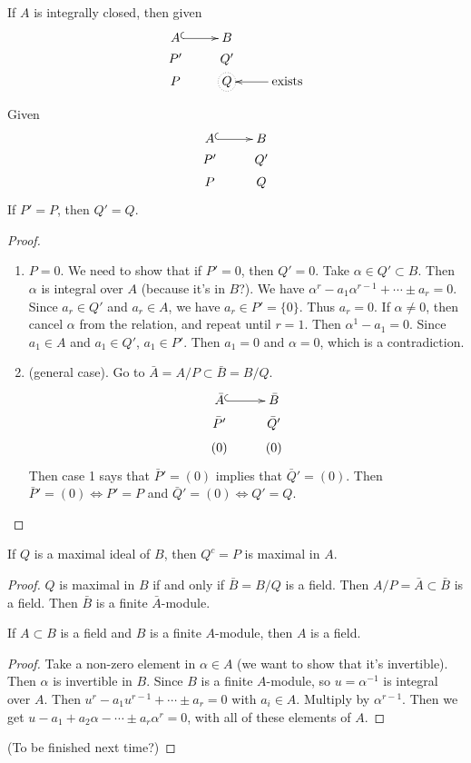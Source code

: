 \documentclass [letterpaper,11pt,twoside]{article}
\begin{document}
  \begin{fact}
    If $A$ is integrally closed, then given
    $$
    \xymatrix @R=0.25em{
      A \ar@{^{(}->}[r] & B \\
      P' &  Q' \\
      P & *+[o][F.]{Q} & \ar[l] \text{exists}
    }
    $$
  \end{fact}

  \begin{lem*}
    Given
    $$
    \xymatrix @R=0.25em{
      A \ar@{^{(}->}[r] & B \\
      P' &  Q' \\
      P & Q
    }
    $$
    If $P' = P$, then $Q' = Q$.
  \end{lem*}
  \begin{proof}
    \begin{enumerate}[{Case }1:]
      \item $P = 0$.  We need to show that if $P' = 0$, then $Q' = 0$.  Take $\alpha \in Q' \subset B$.  Then $\alpha$ is integral over $A$ (because it's in $B$?).  We have $\alpha^r - a_1 \alpha^{r-1} + \cdots \pm a_r = 0$.  Since $a_r \in Q'$ and $a_r\in A$, we have $a_r \in P' = \{0\}$.  Thus $a_r = 0$.  If $\alpha \ne 0$, then cancel $\alpha$ from the relation, and repeat until $r = 1$.  Then $\alpha^1 - a_1 = 0$.  Since $a_1 \in A$ and $a_1 \in Q'$, $a_1\in P'$.  Then $a_1 = 0$ and $\alpha = 0$, which is a contradiction.
      \item (general case).  Go to $\bar A = A / P \subset \bar B = B / Q$.
        $$
        \xymatrix @R=0.25em{
          \bar A \ar@{^{(}->}[r] & \bar B \\
          \bar P' &  \bar Q' \\
          (0) & (0)
        }
        $$
        Then case 1 says that $\bar P' = (0)$ implies that $\bar Q' = (0)$.  Then $\bar P' = (0) \iff P' = P$ and $\bar Q' = (0) \iff Q' = Q$.
    \end{enumerate}
  \end{proof}
  \begin{lem*}
    If $Q$ is a maximal ideal of $B$, then $Q^c = P$ is maximal in $A$.
  \end{lem*}
  \begin{proof}
    $Q$ is maximal in $B$ if and only if $\bar B = B / Q$ is a field.  Then $A / P = \bar A \subset \bar B$ is a field.  Then $\bar B$ is a finite $\bar A$-module.
    \begin{lem*}
      If $A \subset B$ is a field and $B$ is a finite $A$-module, then $A$ is a field.
    \end{lem*}
    \begin{proof}
      Take a non-zero element in $\alpha\in A$ (we want to show that it's invertible).  Then $\alpha$ is invertible in $B$.  Since $B$ is a finite $A$-module, so $u = \alpha^{-1}$ is integral over $A$.  Then $u^r - a_1 u^{r-1} + \cdots \pm a_r = 0$ with $a_i \in A$.  Multiply by $\alpha^{r - 1}$.  Then we get $u - a_1 + a_2 \alpha - \cdots \pm a_r \alpha^r = 0$, with all of these elements of $A$.
    \end{proof}
    (To be finished next time?)
  \end{proof}
\end{document}
